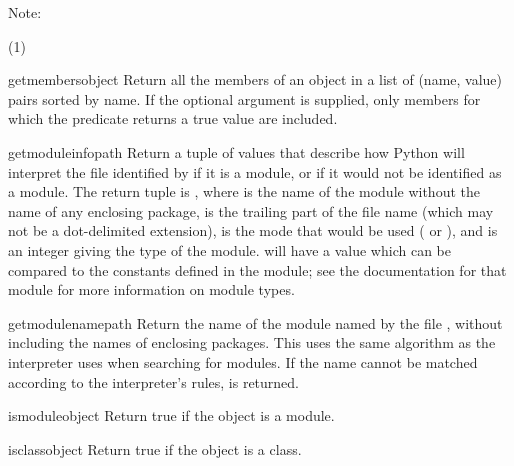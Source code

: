 \noindent
Note:
\begin{description}
\item[(1)]
\end{description}


\begin{funcdesc}{getmembers}{object}
  Return all the members of an object in a list of (name, value) pairs
  sorted by name.  If the optional  argument is supplied,
  only members for which the predicate returns a true value are included.
\end{funcdesc}

\begin{funcdesc}{getmoduleinfo}{path}
  Return a tuple of values that describe how Python will interpret the
  file identified by  if it is a module, or  if
  it would not be identified as a module.  The return tuple is
  , where
   is the name of the module without the name of any
  enclosing package,  is the trailing part of the file
  name (which may not be a dot-delimited extension),  is the
   mode that would be used ( or
  ), and  is an integer giving the type of the
  module.   will have a value which can be compared to the
  constants defined in the  module; see the
  documentation for that module for more information on module types.
\end{funcdesc}

\begin{funcdesc}{getmodulename}{path}
  Return the name of the module named by the file , without
  including the names of enclosing packages.  This uses the same
  algorithm as the interpreter uses when searching for modules.  If
  the name cannot be matched according to the interpreter's rules,
   is returned.
\end{funcdesc}

\begin{funcdesc}{ismodule}{object}
  Return true if the object is a module.
\end{funcdesc}

\begin{funcdesc}{isclass}{object}
  Return true if the object is a class.
\end{funcdesc}


